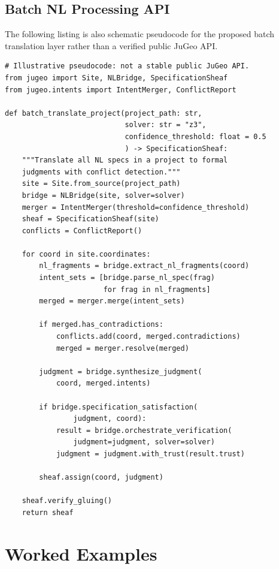 \documentclass[11pt]{article}
\begin{document}
\subsection{Batch NL Processing API}

The following listing is also schematic pseudocode for the proposed batch
translation layer rather than a verified public JuGeo API.

\begin{lstlisting}[style=jugeo-python]
# Illustrative pseudocode: not a stable public JuGeo API.
from jugeo import Site, NLBridge, SpecificationSheaf
from jugeo.intents import IntentMerger, ConflictReport

def batch_translate_project(project_path: str,
                            solver: str = "z3",
                            confidence_threshold: float = 0.5
                            ) -> SpecificationSheaf:
    """Translate all NL specs in a project to formal
    judgments with conflict detection."""
    site = Site.from_source(project_path)
    bridge = NLBridge(site, solver=solver)
    merger = IntentMerger(threshold=confidence_threshold)
    sheaf = SpecificationSheaf(site)
    conflicts = ConflictReport()

    for coord in site.coordinates:
        nl_fragments = bridge.extract_nl_fragments(coord)
        intent_sets = [bridge.parse_nl_spec(frag)
                       for frag in nl_fragments]
        merged = merger.merge(intent_sets)

        if merged.has_contradictions:
            conflicts.add(coord, merged.contradictions)
            merged = merger.resolve(merged)

        judgment = bridge.synthesize_judgment(
            coord, merged.intents)

        if bridge.specification_satisfaction(
                judgment, coord):
            result = bridge.orchestrate_verification(
                judgment=judgment, solver=solver)
            judgment = judgment.with_trust(result.trust)

        sheaf.assign(coord, judgment)

    sheaf.verify_gluing()
    return sheaf
\end{lstlisting}

\section{Worked Examples}\label{sec:worked-examples}
\end{document}
